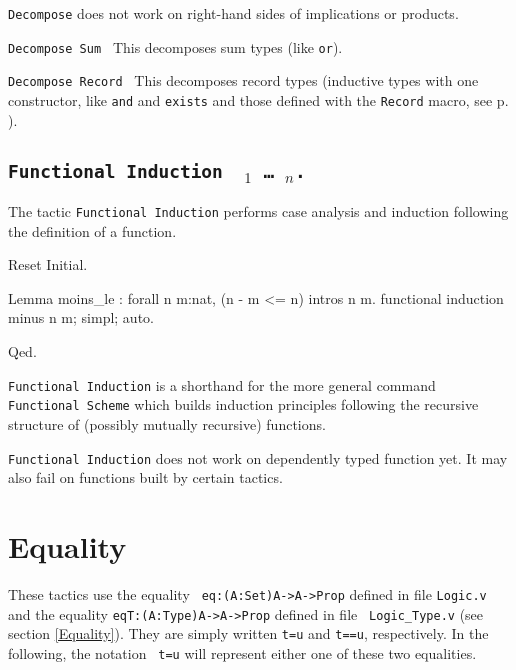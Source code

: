 {\tt Decompose} does not work on right-hand sides of implications or products.

\begin{Variants}
  
\item {\tt Decompose Sum \term}
  This decomposes sum types (like \texttt{or}).
\item {\tt Decompose Record \term}
  This decomposes record types (inductive types with one constructor,
  like \texttt{and} and \texttt{exists} and those defined with the
  \texttt{Record} macro, see p. \pageref{Record}).
\end{Variants}


\subsection{\tt Functional Induction \ident\ \term$_1$ \dots\ \term$_n$.}
\label{FunScheme}

The tactic \texttt{Functional Induction} performs case analysis
and induction following the definition of a function.

\begin{coq_eval}
Reset Initial.
\end{coq_eval}
\begin{coq_example}
Lemma moins_le : forall n m:nat, (n - m <= n)%
intros n m.
functional induction minus n m; simpl; auto.
\end{coq_example}
\begin{coq_example*}
Qed.
\end{coq_example*}

\texttt{Functional Induction} is a shorthand for the more general
command \texttt{Functional Scheme} which builds induction
principles following the recursive structure of (possibly
mutually recursive) functions.

\texttt{Functional Induction} does not work on dependently typed
function yet. It may also fail on functions built by certain
tactics.

\SeeAlso{\ref{FunScheme},\ref{FunScheme-examples}}

\section{Equality}
These tactics use the equality {\tt
eq:(A:Set)A->A->Prop} defined in file {\tt Logic.v} and the equality
{\tt eqT:(A:Type)A->A->Prop} defined in file {\tt
Logic\_Type.v} (see section \ref{Equality}). They
are simply written {\tt t=u} and {\tt t==u},
respectively.  In the following, the notation {\tt
t=u} will represent either one of these two
equalities.

